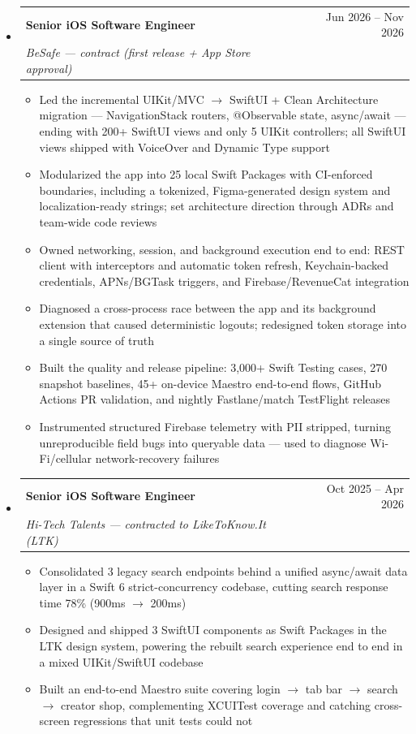 \documentclass[11pt,letterpaper]{article}
\makeatletter
\newcommand{\resumeSubheading}[4]{
  \item
    \begin{tabular*}{\linewidth}{l@{\extracolsep{\fill}}r}
      \textbf{#1} & #2 \\
      \textit{#3} & \textit{#4} \\
    \end{tabular*}
}
\newcommand{\resumeItem}[1]{
  \item{#1}
}
\makeatother
\begin{document}
\begin{itemize}[leftmargin=0.15in, label={}]
    \resumeSubheading
        {Senior iOS Software Engineer}{Jun 2026 -- Nov 2026}
        {BeSafe --- contract (first release + App Store approval)}{}
        \begin{itemize}
            \resumeItem{Led the incremental UIKit/MVC $\rightarrow$ SwiftUI + Clean Architecture migration --- NavigationStack routers, \mbox{@Observable} state, async/await --- ending with 200+ SwiftUI views and only 5 UIKit controllers; all SwiftUI views shipped with VoiceOver and Dynamic Type support}
            \resumeItem{Modularized the app into 25 local Swift Packages with CI-enforced boundaries, including a tokenized, Figma-generated design system and localization-ready strings; set architecture direction through ADRs and team-wide code reviews}
            \resumeItem{Owned networking, session, and background execution end to end: REST client with interceptors and automatic token refresh, Keychain-backed credentials, APNs/BGTask triggers, and Firebase/RevenueCat integration}
            \resumeItem{Diagnosed a cross-process race between the app and its background extension that caused deterministic logouts; redesigned token storage into a single source of truth}
            \resumeItem{Built the quality and release pipeline: 3,000+ Swift Testing cases, 270 snapshot baselines, 45+ on-device Maestro end-to-end flows, GitHub Actions PR validation, and nightly Fastlane/match TestFlight releases}
            \resumeItem{Instrumented structured Firebase telemetry with PII stripped, turning unreproducible field bugs into queryable data --- used to diagnose Wi-Fi/cellular network-recovery failures}
        \end{itemize}

    \resumeSubheading
        {Senior iOS Software Engineer}{Oct 2025 -- Apr 2026}
        {Hi-Tech Talents --- contracted to LikeToKnow.It (LTK)}{}
        \begin{itemize}
            \resumeItem{Consolidated 3 legacy search endpoints behind a unified async/await data layer in a Swift 6 strict-concurrency codebase, cutting search response time 78\% (900ms $\rightarrow$ 200ms)}
            \resumeItem{Designed and shipped 3 SwiftUI components as Swift Packages in the LTK design system, powering the rebuilt search experience end to end in a mixed UIKit/SwiftUI codebase}
            \resumeItem{Built an end-to-end Maestro suite covering login $\rightarrow$ tab bar $\rightarrow$ search $\rightarrow$ creator shop, complementing XCUITest coverage and catching cross-screen regressions that unit tests could not}
        \end{itemize}


\end{itemize}
\end{document}
